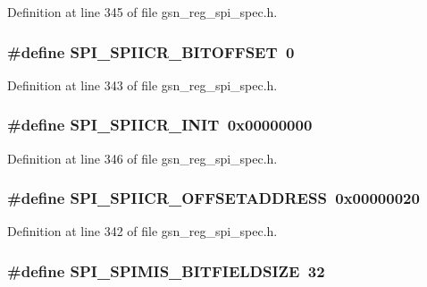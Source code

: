 Definition at line 345 of file gsn\_\-reg\_\-spi\_\-spec.h.

\hypertarget{a00573_a38d9e4e3e205e09352e0222f2e3ddb6a}{
\subsubsection[{SPI\_\-SPIICR\_\-BITOFFSET}]{\setlength{\rightskip}{0pt plus 5cm}\#define SPI\_\-SPIICR\_\-BITOFFSET~0}}
\label{a00573_a38d9e4e3e205e09352e0222f2e3ddb6a}


Definition at line 343 of file gsn\_\-reg\_\-spi\_\-spec.h.

\hypertarget{a00573_a87eb23dc6c5cb884d038ba6da298457f}{
\subsubsection[{SPI\_\-SPIICR\_\-INIT}]{\setlength{\rightskip}{0pt plus 5cm}\#define SPI\_\-SPIICR\_\-INIT~0x00000000}}
\label{a00573_a87eb23dc6c5cb884d038ba6da298457f}


Definition at line 346 of file gsn\_\-reg\_\-spi\_\-spec.h.

\hypertarget{a00573_a356267879c0295e9ef1f74dc838c8d32}{
\subsubsection[{SPI\_\-SPIICR\_\-OFFSETADDRESS}]{\setlength{\rightskip}{0pt plus 5cm}\#define SPI\_\-SPIICR\_\-OFFSETADDRESS~0x00000020}}
\label{a00573_a356267879c0295e9ef1f74dc838c8d32}


Definition at line 342 of file gsn\_\-reg\_\-spi\_\-spec.h.

\hypertarget{a00573_af362e131cb4eb93e36eb27ff5c7c319b}{
\subsubsection[{SPI\_\-SPIMIS\_\-BITFIELDSIZE}]{\setlength{\rightskip}{0pt plus 5cm}\#define SPI\_\-SPIMIS\_\-BITFIELDSIZE~32}}
\label{a00573_af362e131cb4eb93e36eb27ff5c7c319b}


